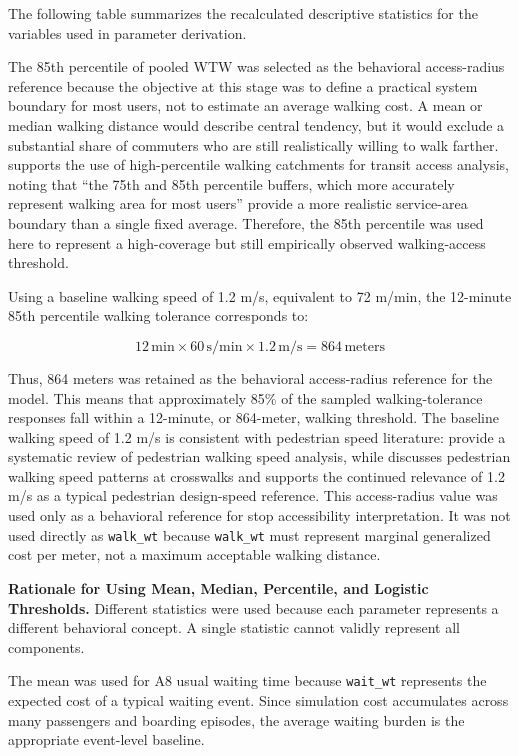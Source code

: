 {The following table summarizes the recalculated descriptive statistics for the variables used in parameter derivation.



The 85th percentile of pooled \ac{WTW} was selected as the behavioral access-radius reference because the objective at this stage was to define a practical system boundary for most users, not to estimate an average walking cost. A mean or median walking distance would describe central tendency, but it would exclude a substantial share of commuters who are still realistically willing to walk farther. \cite{elgeneidy2014walking} supports the use of high-percentile walking catchments for transit access analysis, noting that ``the 75th and 85th percentile buffers, which more accurately represent walking area for most users'' provide a more realistic service-area boundary than a single fixed average. Therefore, the 85th percentile was used here to represent a high-coverage but still empirically observed walking-access threshold.

Using a baseline walking speed of 1.2 m/s, equivalent to 72 m/min, the 12-minute 85th percentile walking tolerance corresponds to:

\[
12 \,\text{min} \times 60 \,\text{s/min} \times 1.2 \,\text{m/s} = 864 \,\text{meters}
\]

Thus, 864 meters was retained as the behavioral access-radius reference for the model. This means that approximately 85\% of the sampled walking-tolerance responses fall within a 12-minute, or 864-meter, walking threshold. The baseline walking speed of 1.2 m/s is consistent with pedestrian speed literature: \cite{katsaros2024} provide a systematic review of pedestrian walking speed analysis, while \cite{hassouna2020evaluation} discusses pedestrian walking speed patterns at crosswalks and supports the continued relevance of 1.2 m/s as a typical pedestrian design-speed reference. This access-radius value was used only as a behavioral reference for stop accessibility interpretation. It was not used directly as \texttt{walk\_wt} because \texttt{walk\_wt} must represent marginal generalized cost per meter, not a maximum acceptable walking distance.

\noindent\textbf{Rationale for Using Mean, Median, Percentile, and Logistic Thresholds.}
Different statistics were used because each parameter represents a different behavioral concept. A single statistic cannot validly represent all components.

The mean was used for A8 usual waiting time because \texttt{wait\_wt} represents the expected cost of a typical waiting event. Since simulation cost accumulates across many passengers and boarding episodes, the average waiting burden is the appropriate event-level baseline.

}
